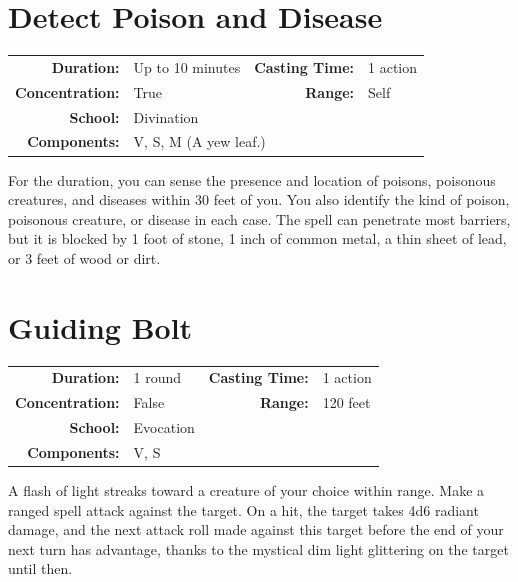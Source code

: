\documentclass[12pt,showtrims]{memoir}
\begin{document}
\newpage
\section*{Detect Poison and Disease}

{
\small\centering\vspace{-6pt}
\begin{tabular}{rlrl}
\toprule

\textbf{Duration:} & Up to 10 minutes &
\textbf{Casting Time:} & 1 action \\
\textbf{Concentration:} & True &
\textbf{Range:} & Self \\
\textbf{School:} & Divination \\
\textbf{Components:} & \multicolumn{3}{p{0.7\textwidth}}{V, S, M (A yew leaf.)}\\

\bottomrule
\end{tabular}
}

\vspace{1\baselineskip}\noindent For the duration, you can sense the presence and location of poisons, poisonous creatures, and diseases within 30 feet of you. You also identify the kind of poison, poisonous creature, or disease in each case. The spell can penetrate most barriers, but it is blocked by 1 foot of stone, 1 inch of common metal, a thin sheet of lead, or 3 feet of wood or dirt.

\newpage
\section*{Guiding Bolt}

{
\small\centering\vspace{-6pt}
\begin{tabular}{rlrl}
\toprule

\textbf{Duration:} & 1 round &
\textbf{Casting Time:} & 1 action \\
\textbf{Concentration:} & False &
\textbf{Range:} & 120 feet \\
\textbf{School:} & Evocation \\
\textbf{Components:} & \multicolumn{3}{p{0.7\textwidth}}{V, S}\\

\bottomrule
\end{tabular}
}

\vspace{1\baselineskip}\noindent A flash of light streaks toward a creature of your choice within range. Make a ranged spell attack against the target. On a hit, the target takes 4d6 radiant damage, and the next attack roll made against this target before the end of your next turn has advantage, thanks to the mystical dim light glittering on the target until then.
\end{document}
